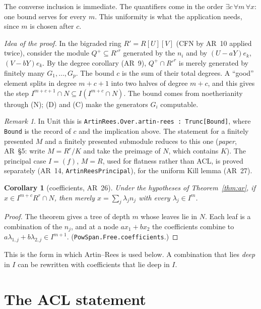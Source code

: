 \documentclass[11pt]{amsart}
\newtheorem{corollary}[theorem]{Corollary}
\theoremstyle{definition}
\theoremstyle{remark}
\newtheorem{remark}[theorem]{Remark}
\begin{document}
The converse inclusion is immediate. The quantifiers come in the order
$\exists c\,\forall m\,\forall x$: one bound serves for every $m$. This
uniformity is what the application needs, since $m$ is chosen after $c$.

\emph{Idea of the proof.} In the bigraded ring $R'=R[U][V]$ (CFN by AR~10
applied twice), consider the module $Q^+\subseteq R'^r$ generated by the
$n_i$ and by $(U-aY)e_k$, $(V-bY)e_k$. By the degree corollary (AR~9),
$Q^+\cap R'^r$ is merely generated by finitely many $G_1,\dots,G_p$. The
bound $c$ is the sum of their total degrees. A ``good'' element splits in
degree $m+c+1$ into two halves of degree $m+c$, and this gives the step
$I^{m+c+1}\cap N\subseteq I(I^{m+c}\cap N)$. The bound comes from
noetherianity through (N); (D) and (C) make the generators $G_i$
computable.

\begin{remark}
In Unit this is \texttt{ArtinRees.Over.artin-rees :
Trunc[Bound]}, where \texttt{Bound} is the record of $c$ and the
implication above. The statement for a finitely presented $M$ and a
finitely presented submodule reduces to this one
(\emph{paper}, AR~\S5: write $M=R^r/K$ and take the preimage of $N$,
which contains $K$). The principal case $I=(f)$, $M=R$, used for flatness rather than ACL, is
proved separately (AR~14, \texttt{ArtinReesPrincipal}), for the uniform
Kill lemma (AR~27).
\end{remark}

\begin{corollary}[coefficients, AR~26]\label{cor:coef}
Under the hypotheses of Theorem~\ref{thm:ar}, if
$x\in I^{m+c}R^r\cap N$, then merely $x=\sum_j\lambda_jn_j$ with every
$\lambda_j\in I^m$.
\end{corollary}

\begin{proof}
The theorem gives a tree of depth $m$ whose leaves lie in $N$. Each leaf
is a combination of the $n_j$, and at a node $ax_1+bx_2$ the
coefficients combine to $a\lambda_{1,j}+b\lambda_{2,j}\in I^{m+1}$.
(\texttt{PowSpan.Free.coefficients}.)
\end{proof}

This is the form in which Artin--Rees is used below. A combination
that lies \emph{deep} in $I$ can be rewritten with coefficients that lie
deep in $I$.

\section{The ACL statement}
\end{document}
